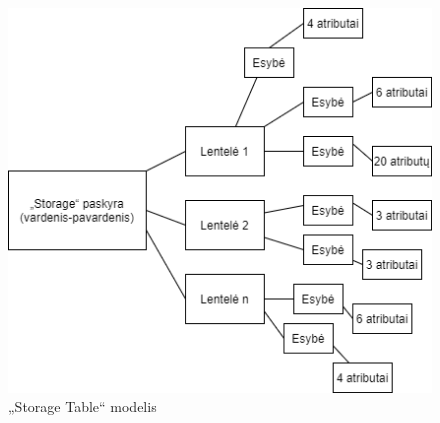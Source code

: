 \begin{figure}[htp!]
\hspace{-1cm}
\centering
\includegraphics[scale=0.5]{img/Storage_modelis.png}
\caption{„Storage Table“ modelis}
\label{fig:storage_table_model}
\end{figure}
